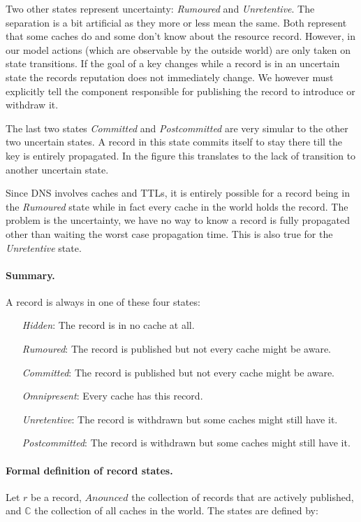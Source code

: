 \documentclass[twoside,english, a4paper]{article}
\begin{document}
Two other states represent uncertainty: \emph{Rumoured} and \emph
{Unretentive}. The separation is a bit artificial as they more or less 
mean the same. Both represent that some caches do and some don't 
know about the resource record. However, in our model actions (which 
are observable by the outside world) are only taken on state 
transitions. If the goal of a key changes while a record is in an 
uncertain state the records reputation does not immediately change. We 
however must explicitly tell the component responsible for 
publishing the record to introduce or withdraw it. 

The last two states \emph{Committed} and \emph
{Postcommitted} are very simular to the other two uncertain states. A
record in this state commits itself to stay there till the key is entirely
propagated. In the figure this translates to the lack of transition to
another uncertain state.

Since DNS involves caches and TTLs, it is entirely possible for a 
record being in the \emph{Rumoured} state while in fact every cache 
in the world holds the record. The problem is the uncertainty, we have
no way to know a record is fully propagated other than waiting the
worst case propagation time. This is also true for the \emph{Unretentive}
state.

\paragraph{Summary.} A record is always in one of these four states:

\begin{itemize}
\item[\emph{Hidden}:] 		
			The record is in no cache at all.
\item[\emph{Rumoured}:] 		
			The record is published but not every cache might be aware.
\item[\emph{Committed}:] 		
			The record is published but not every cache might be aware.
\item[\emph{Omnipresent}:]
			Every cache has this record.
\item[\emph{Unretentive}:]
			The record is withdrawn but some caches might still have it.
\item[\emph{Postcommitted}:]
			The record is withdrawn but some caches might still have it.
\end{itemize} 

\paragraph{Formal definition of record states.} Let $r$ be a record, $Anounced$ the 
collection of records that are actively published, and $\mathbb{C}$
the collection of all caches in the world. The states are defined by:
\end{document}

